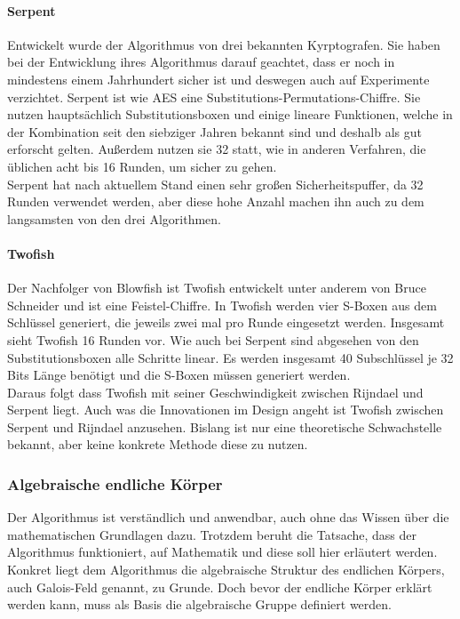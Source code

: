  \paragraph{Serpent}
 Entwickelt wurde der Algorithmus von drei bekannten Kyrptografen. Sie haben bei der Entwicklung ihres
 Algorithmus darauf geachtet, dass er noch in mindestens einem Jahrhundert sicher ist und deswegen auch
 auf Experimente verzichtet. Serpent ist wie AES eine Substitutions-Permutations-Chiffre. Sie nutzen
 hauptsächlich Substitutionsboxen und einige lineare Funktionen, welche
 in der Kombination seit den siebziger Jahren bekannt sind und deshalb als gut erforscht gelten.
 Außerdem nutzen sie 32 statt, wie in anderen Verfahren, die üblichen acht bis 16 Runden, um sicher zu gehen. \\
 Serpent hat nach aktuellem Stand einen sehr großen Sicherheitspuffer, da 32 Runden verwendet werden, aber
 diese hohe Anzahl machen ihn auch zu dem langsamsten von den drei Algorithmen. \cite{schmeh07}
 
 \paragraph{Twofish}
 Der Nachfolger von Blowfish ist Twofish entwickelt unter anderem von Bruce Schneider und ist eine Feistel-Chiffre.
 In Twofish werden vier S-Boxen aus dem
 Schlüssel generiert, die jeweils zwei mal pro Runde eingesetzt werden. Insgesamt sieht Twofish 16 Runden vor.
 Wie auch bei Serpent sind abgesehen von den Substitutionsboxen alle Schritte linear. Es werden insgesamt 40
 Subschlüssel je 32 Bits Länge benötigt und die S-Boxen müssen generiert werden. \\
 Daraus folgt dass Twofish mit seiner Geschwindigkeit zwischen Rijndael und Serpent liegt. Auch was die Innovationen
 im Design angeht ist Twofish zwischen Serpent und Rijndael anzusehen. Bislang ist nur eine theoretische Schwachstelle
 bekannt, aber keine konkrete Methode diese zu nutzen. \cite{schmeh07}
 
 \subsubsection{Algebraische endliche Körper}
 Der Algorithmus ist verständlich und anwendbar, auch ohne das Wissen über die mathematischen
 Grundlagen dazu. Trotzdem beruht die Tatsache, dass der Algorithmus funktioniert, auf Mathematik
 und diese soll hier erläutert werden. Konkret liegt dem Algorithmus die algebraische Struktur des
 endlichen Körpers, auch Galois-Feld genannt, zu Grunde. Doch bevor der endliche Körper
 erklärt werden kann, muss als Basis die algebraische Gruppe definiert werden.
 
